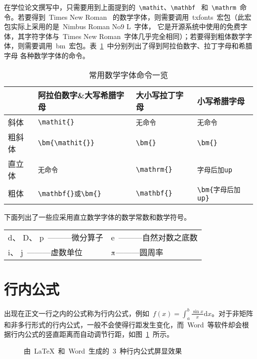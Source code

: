 在学位论文撰写中，只需要用到上面提到的~\verb|\mathit|、\verb|\mathbf|~ 和~\verb|\mathrm|~命令。若要得到~Times New Roman~ 的数学字体，则需要调用~txfonts~宏包（此宏包实际上采用的是~Nimbus Roman No9 L~字体，
它是开源系统中使用的免费字体，其字符字体与~Times New Roman~字体几乎完全相同）；若要得到粗体数学字体，则需要调用~bm~宏包。表~\ref{tab:fonts}~中分别列出了得到阿拉伯数字、拉丁字母和希腊字母
各种数学字体的命令。

\begin{table}[htbp]
\caption{常用数学字体命令一览}\label{tab:fonts}
\vspace{0.5em}\centering\wuhao
\begin{tabular}{llll}
\toprule
 & 阿拉伯数字\&大写希腊字母 & 大小写拉丁字母 & 小写希腊字母  \\
\midrule
斜体 & \verb|\mathit{}| & \verb|无命令| & \verb|无命令|\\
粗斜体 & \verb|\bm{\mathit{}}| & \verb|\bm{}| & \verb|\bm{}|\\
直立体 & \verb|无命令| & \verb|\mathrm{}| & \verb|字母后加up|\\
粗体 & \verb|\mathbf{}或\bm{}| & \verb|\mathbf{}| & \verb|\bm{字母后加up}|\\
\bottomrule
\end{tabular}
\vspace{\baselineskip}
\end{table}

\noindent 下面列出了一些应采用直立数学字体的数学常数和数学符号。

\vspace{-0.5em}\begin{center}\begin{tabularx}{0.7\textwidth}{XX}
$\mathrm{d}$、 $\mathrm{D}$、 $\mathrm{p}$~———微分算子 & $\mathrm{e}$~———自然对数之底数\\
$\mathrm{i}$、 $\mathrm{j}$~———虚数单位 & $\piup$———圆周率\\
\end{tabularx}\end{center}

\section{行内公式}
出现在正文一行之内的公式称为行内公式，例如~$f(x)=\int_{a}^{b}\frac{\sin{x}}{x}\mathrm{d}x$。对于非矩阵和非多行形式的行内公式，一般不会使得行距发生变化，而~Word~等软件却会根据行内公式的竖直距离而自动调节行距，如图~\ref{fig:hangju}~所示。

\begin{figure}[htbp]
\centering
{}

\caption{由~\LaTeX~和~Word~生成的~3~种行内公式屏显效果}\label{fig:hangju}
\vspace{-1em}
\end{figure}

